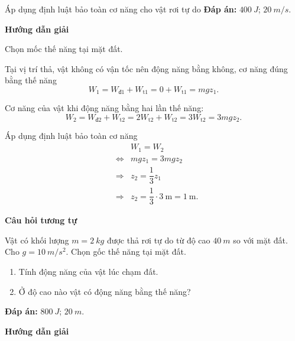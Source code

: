 \begin{dang}{Áp dụng định luật bảo toàn cơ năng cho vật rơi tự do }
{		\textbf{Đáp án:} $\SI{400}{J}$; $\SI{20}{m/s}$.
	}
	{	\begin{center}
			\textbf{Hướng dẫn giải}
		\end{center}
		
		Chọn mốc thế năng tại mặt đất.
		
		Tại vị trí thả, vật không có vận tốc nên động năng bằng không, cơ năng đúng bằng thế năng
		\begin{equation*}
			W_1=W_\text{đ1}+W_\text{t1}=0+W_\text{t1}=mgz_1.
		\end{equation*}
		
		Cơ năng của vật khi động năng bằng hai lần thế năng:
		\begin{equation*}
			W_2=W_\text{đ2}+W_\text{t2}=2W_\text{t2}+W_\text{t2}=3W_\text{t2}=3mgz_2.
		\end{equation*}
		
		Áp dụng định luật bảo toàn cơ năng
		\begin{eqnarray*}
			&&W_1=W_2\\
			&\Leftrightarrow& mgz_1 = 3mgz_2\\
			&\Rightarrow& z_2 = \dfrac{1}{3}z_1\\
			&\Rightarrow&z_2 =\dfrac{1}{3}\cdot \SI{3}{\meter}=\SI{1}{\meter}.
		\end{eqnarray*}
		
		\begin{center}
			\textbf{Câu hỏi tương tự}
		\end{center}
		
		Vật có khối lượng $m=\SI{2}{kg}$ được thả rơi tự do từ độ cao $\SI{40}{m}$ so với mặt đất. Cho $g=\SI{10}{m/s^2}$. Chọn gốc thế năng tại mặt đất.
		\begin{enumerate}[label=\alph*)]
			\item Tính động năng của vật lúc chạm đất.
			\item Ở độ cao nào vật có động năng bằng thế năng?
		\end{enumerate}
		
		\textbf{Đáp án:} $\SI{800}{J}$; $\SI{20}{m}$.
	}
	{\begin{center}
			\textbf{Hướng dẫn giải}
		\end{center}
		
}
\end{dang}
